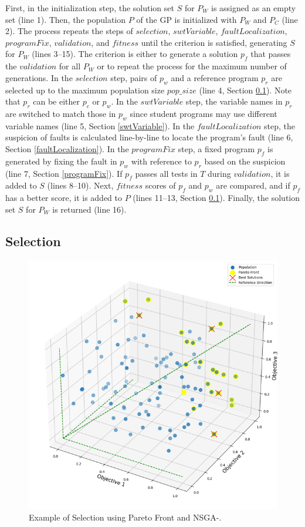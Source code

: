 \documentclass[10pt,conference]{IEEEtran}
\begin{document}
        First, in the initialization step, the solution set $S$ for $P_{W}$ is assigned as an empty set (line 1). Then, the population $P$ of the GP is initialized with $P_{W}$ and $P_{C}$ (line 2). The process repeats the steps of $selection$, $swtVariable$, $faultLocalization$, $programFix$, $validation$, and $fitness$ until the criterion is satisfied, generating $S$ for $P_{W}$ (lines 3–15). The criterion is either to generate a solution $p_{f}$ that passes the $validation$ for all $P_{W}$ or to repeat the process for the maximum number of generations. In the $selection$ step, pairs of $p_{w}$ and a reference program $p_{r}$ are selected up to the maximum population size $pop\_size$ (line 4, Section \ref{Selection}). Note that $p_{r}$ can be either $p_{c}$ or $p_{w}$. In the $swtVariable$ step, the variable names in $p_{r}$ are switched to match those in $p_{w}$ since student programs may use different variable names (line 5, Section \ref{swtVariable}). In the $faultLocalization$ step, the suspicion of faults is calculated line-by-line to locate the program’s fault (line 6, Section \ref{faultLocalization}). In the $programFix$ step, a fixed program $p_{f}$ is generated by fixing the fault in $p_{w}$ with reference to $p_{r}$ based on the suspicion (line 7, Section \ref{programFix}). If $p_{f}$ passes all tests in $T$ during $validation$, it is added to $S$ (lines 8–10). Next, $fitness$ scores of $p_{f}$ and $p_{w}$ are compared, and if $p_{f}$ has a better score, it is added to $P$ (lines 11–13, Section \ref{Selection}). Finally, the solution set $S$ for $P_{W}$ is returned (line 16).


    \subsection{Selection}\label{Selection}

        \begin{figure}[t]
            \centering
            \includegraphics[width=0.8\linewidth]{NSGA3.png}
            \caption{Example of Selection using Pareto Front and NSGA-\uppercase\expandafter{}.}
            \label{nsga3}
        \end{figure}
\end{document}
